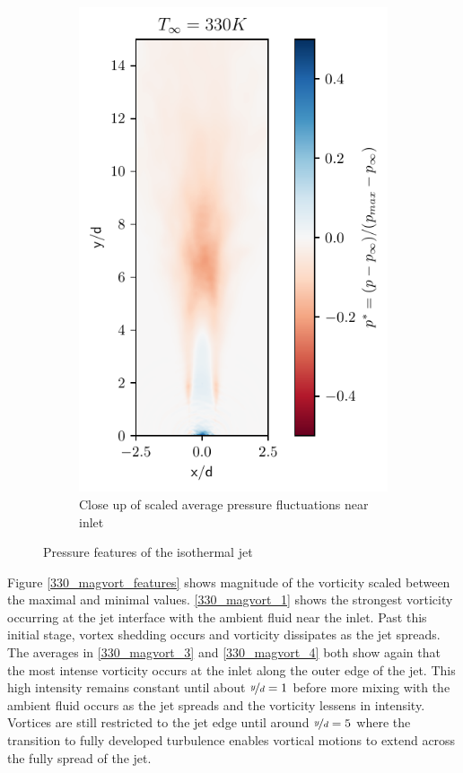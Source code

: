 \begin{figure}[htbp!]
\begin{subfigure}{0.25\textwidth}
	\includegraphics[scale=.65]{figures/Plots/vertical/330/pressure_scaled_vert_avg_330_zoom.pdf}
	\caption{Close up of scaled average pressure fluctuations near inlet} \label{330_pressure_4}
\end{subfigure}
\caption{Pressure features of the isothermal jet}
\label{330_pressure_features}
\end{figure}

Figure \ref{330_magvort_features} shows magnitude of the vorticity scaled between the maximal and minimal values. \ref{330_magvort_1} shows the strongest vorticity occurring at the jet interface with the ambient fluid near the inlet. Past this initial stage, vortex shedding occurs and vorticity dissipates as the jet spreads. The averages in \ref{330_magvort_3} and \ref{330_magvort_4} both show again that the most intense vorticity occurs at the inlet along the outer edge of the jet. This high intensity remains constant until about $\nicefrac{y}{d}=1$ before more mixing with the ambient fluid occurs as the jet spreads and the vorticity lessens in intensity. Vortices are still restricted to the jet edge until around $\nicefrac{y}{d} = 5$ where the transition to fully developed turbulence enables vortical motions to extend across the fully spread of the jet. 

